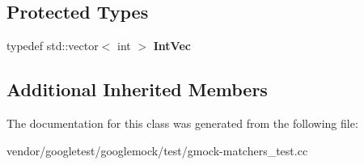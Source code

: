 \subsection*{Protected Types}
\begin{DoxyCompactItemize}
\item 
\mbox{\label{classtesting_1_1gmock__matchers__test_1_1_unordered_elements_are_test_a608750c71652943bd11fe7bb5281588d}} 
typedef std\+::vector$<$ int $>$ {\bfseries Int\+Vec}
\end{DoxyCompactItemize}
\subsection*{Additional Inherited Members}


The documentation for this class was generated from the following file\+:\begin{DoxyCompactItemize}
\item 
vendor/googletest/googlemock/test/gmock-\/matchers\+\_\+test.\+cc\end{DoxyCompactItemize}
